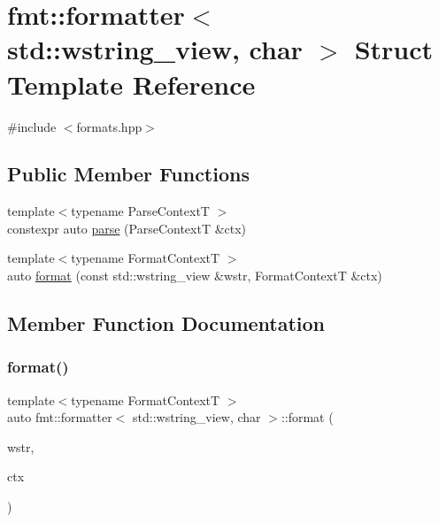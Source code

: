 \hypertarget{structfmt_1_1formatter_3_01std_1_1wstring__view_00_01char_01_4}{}\section{fmt\+:\+:formatter$<$ std\+:\+:wstring\+\_\+view, char $>$ Struct Template Reference}
\label{structfmt_1_1formatter_3_01std_1_1wstring__view_00_01char_01_4}


{\ttfamily \#include $<$formats.\+hpp$>$}

\subsection*{Public Member Functions}
\begin{DoxyCompactItemize}
\item 
{\footnotesize template$<$typename Parse\+ContextT $>$ }\\constexpr auto \mbox{\hyperlink{structfmt_1_1formatter_3_01std_1_1wstring__view_00_01char_01_4_a96a553f281686396a9741d2e0310361b}{parse}} (Parse\+ContextT \&ctx)
\item 
{\footnotesize template$<$typename Format\+ContextT $>$ }\\auto \mbox{\hyperlink{structfmt_1_1formatter_3_01std_1_1wstring__view_00_01char_01_4_a61120d5ac758b7d548a1e44968c98441}{format}} (const std\+::wstring\+\_\+view \&wstr, Format\+ContextT \&ctx)
\end{DoxyCompactItemize}


\subsection{Member Function Documentation}
\mbox{\label{structfmt_1_1formatter_3_01std_1_1wstring__view_00_01char_01_4_a61120d5ac758b7d548a1e44968c98441}} 
\subsubsection{\texorpdfstring{format()}{format()}}
{\footnotesize\ttfamily template$<$typename Format\+ContextT $>$ \\
auto fmt\+::formatter$<$ std\+::wstring\+\_\+view, char $>$\+::format (\begin{DoxyParamCaption}\item[{const std\+::wstring\+\_\+view \&}]{wstr,  }\item[{Format\+ContextT \&}]{ctx }\end{DoxyParamCaption})}

